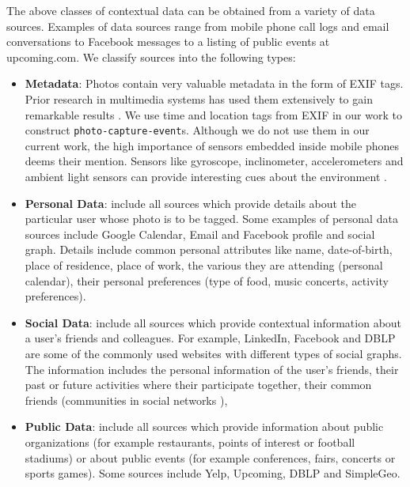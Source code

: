 The above classes of contextual data can be obtained from a variety of data sources. Examples of data sources range from mobile phone call logs and email conversations to Facebook messages to a listing of public events at upcoming.com. We classify sources into the following types:

\begin{itemize}
\item \textbf{Metadata}: Photos contain very valuable metadata in the form of EXIF tags. Prior research in multimedia systems has used them extensively to gain remarkable results \cite{boutell2004photo, sinha2008concept}. We use time and location tags from EXIF in our work to construct \texttt{photo-capture-event}s. Although we do not use them in our current work, the high importance of sensors embedded inside mobile phones deems their mention. Sensors like gyroscope, inclinometer, accelerometers and ambient light sensors can provide interesting cues about the environment \cite{patterson2005assisted, siewiorek2003sensay}.

\item \textbf{Personal Data}: include all sources which provide details about the particular user whose photo is to be tagged. Some examples of personal data sources include Google Calendar, Email and Facebook profile and social graph. Details include common personal attributes like name, date-of-birth, place of residence, place of work, the various they are attending (personal calendar), their personal preferences (type of food, music concerts, activity preferences).

\item \textbf{Social Data}: include all sources which provide contextual information about a user's friends and colleagues. For example, LinkedIn, Facebook and DBLP are some of the commonly used websites with different types of social graphs. The information includes the personal information of the user's friends, their past or future activities where their participate together, their common friends (communities in social networks \cite{backstrom2006group, krawczyk2009communities}), 

\item \textbf{Public Data}: include all sources which provide information about public organizations (for example restaurants, points of interest or football stadiums) or about public events (for example conferences, fairs, concerts or sports games). Some sources include Yelp, Upcoming, DBLP and SimpleGeo.
\end{itemize}

